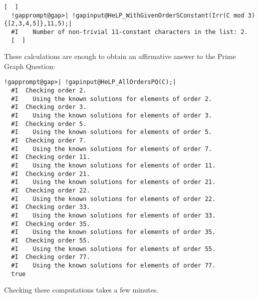 \documentclass[a4paper,11pt]{report}
\begin{document}
{{\begin{Verbatim}[commandchars=!@|,fontsize=\small,frame=single,label=Example]
  [  ] 
  !gapprompt@gap>| !gapinput@HeLP_WithGivenOrderSConstant(Irr(C mod 3){[2,3,4,5]},11,5);|
  #I    Number of non-trivial 11-constant characters in the list: 2.
  [  ] 
\end{Verbatim}
 These calculations are enough to obtain an affirmative answer to the Prime
Graph Question: 
\begin{Verbatim}[commandchars=!@|,fontsize=\small,frame=single,label=Example]
  !gapprompt@gap>| !gapinput@HeLP_AllOrdersPQ(C);|
  #I  Checking order 2.
  #I    Using the known solutions for elements of order 2.
  #I  Checking order 3.
  #I    Using the known solutions for elements of order 3.
  #I  Checking order 5.
  #I    Using the known solutions for elements of order 5.
  #I  Checking order 7.
  #I    Using the known solutions for elements of order 7.
  #I  Checking order 11.
  #I    Using the known solutions for elements of order 11.
  #I  Checking order 21.
  #I    Using the known solutions for elements of order 21.
  #I  Checking order 22.
  #I    Using the known solutions for elements of order 22.
  #I  Checking order 33.
  #I    Using the known solutions for elements of order 33.
  #I  Checking order 35.
  #I    Using the known solutions for elements of order 35.
  #I  Checking order 55.
  #I    Using the known solutions for elements of order 55.
  #I  Checking order 77.
  #I    Using the known solutions for elements of order 77.
  true
\end{Verbatim}
 Checking these computations takes a few minutes. }

 }

   
\end{document}
